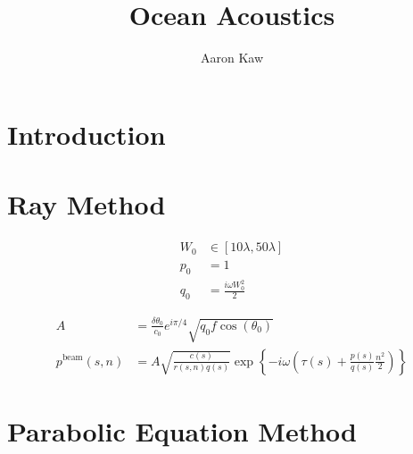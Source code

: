 \documentclass{report}
\title{Ocean Acoustics}
\author{Aaron Kaw}
\date{}
\newcommand{\Par}[1]{\left({#1}\right)}
\newcommand{\Brack}[1]{\left[{#1}\right]}
\newcommand{\Brace}[1]{\left\{{#1}\right\}}
\begin{document}
\maketitle

\chapter{Introduction}

\chapter{Ray Method}

\begin{align*}
	W_0 &\in \Brack{10\lambda, 50\lambda} \\
	p_0 &= 1 \\
	q_0 &= \frac{i\omega W_0^2}{2}
\end{align*}

\begin{align*}
	A &= \frac{\delta\theta_0}{c_0} e^{i\pi/4} \sqrt{q_0 f \cos(\theta_0)} \\
	p^\text{beam}(s, n) &= A \sqrt{\frac{c(s)}{r(s, n) q(s)}} \exp\Brace{-i\omega\Par{\tau(s) + \frac{p(s)}{q(s)} \frac{n^2}{2}}}
\end{align*}

\chapter{Parabolic Equation Method}
\end{document}
